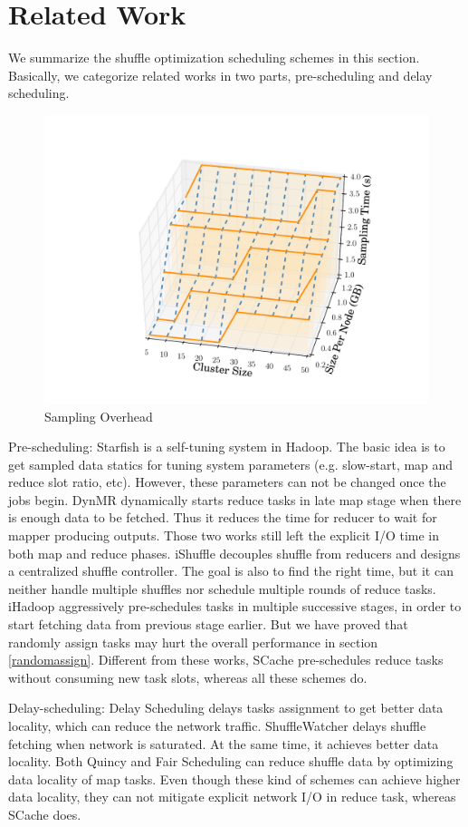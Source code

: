 \section{Related Work}
We summarize the shuffle optimization scheduling schemes in this section. Basically, we categorize related works in two parts, pre-scheduling and delay scheduling.
\begin{figure}
	\centering
	\includegraphics[width=0.6\linewidth]{fig/sampling}
	\caption{Sampling Overhead}
	\label{fig:sampling}
\end{figure}
Pre-scheduling: Starfish \cite{starfish} is a self-tuning system in Hadoop. The basic idea is to get sampled data statics for tuning system parameters (e.g. slow-start, map and reduce slot ratio, etc). However, these parameters can not be changed once the jobs begin. DynMR \cite{dynmr} dynamically starts reduce tasks in late map stage when there is enough data to be fetched. Thus it reduces the time for reducer to wait for mapper producing outputs. Those two works still left the explicit I/O time in both map and reduce phases. iShuffle \cite{ishuffle} decouples shuffle from reducers and designs a centralized shuffle controller. The goal is also to find the right time, but it can neither handle multiple shuffles nor schedule multiple rounds of reduce tasks. iHadoop \cite{ihadoop} aggressively pre-schedules tasks in multiple successive stages, in order to start fetching data from previous stage earlier. But we have proved that randomly assign tasks may hurt the overall performance in section \ref{randomassign}. Different from these works, SCache pre-schedules reduce tasks without consuming new task slots, whereas all these schemes do.

Delay-scheduling: Delay Scheduling \cite{delay} delays tasks assignment to get better data locality, which can reduce the network traffic. ShuffleWatcher \cite{shufflewatcher} delays shuffle fetching when network is saturated. At the same time, it achieves better data locality. Both Quincy \cite{quincy} and Fair Scheduling \cite{preemptive} can reduce shuffle data by optimizing data locality of map tasks. Even though these kind of schemes can achieve higher data locality, they can not mitigate explicit network I/O in reduce task, whereas SCache does. 